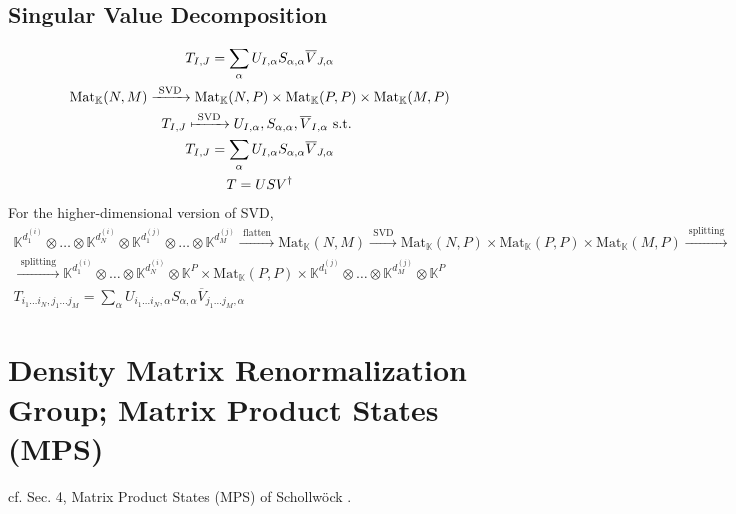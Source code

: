 \documentclass[10pt]{amsart}
\begin{document}
\begin{multicols*}{2}
\subsection{Singular Value Decomposition}  

\begin{equation}
\begin{gathered}
	T_{I,J} = \sum_{\alpha} U_{I,\alpha} S_{\alpha,\alpha} \overline{V}_{J,\alpha} \\ 
 \text{Mat}_{\mathbb{K}}(N,M) \xrightarrow{ \text{ SVD } } \text{Mat}_{\mathbb{K}}(N,P) \times \text{Mat}_{\mathbb{K}}(P,P) \times \text{Mat}_{\mathbb{K}}(M,P)    \\
	T_{I,J} \xmapsto{ \text{ SVD } } U_{I,\alpha}, S_{\alpha,\alpha} , \overline{V}_{I,\alpha} \text{ s.t. } \\
T_{I,J} = \sum_{\alpha} U_{I,\alpha} S_{\alpha, \alpha} \overline{V}_{J,\alpha}    \\
T=USV^{\dag}
\end{gathered}
\end{equation}
For the higher-dimensional version of SVD, 
\begin{equation}
\begin{gathered}
	\mathbb{K}^{d_1^{(i)} } \otimes \dots \otimes \mathbb{K}^{d^{(i)}_N} \otimes \mathbb{K}^{d_1^{(j)} }\otimes \dots \otimes \mathbb{K}^{d_M^{(j)} }  \xrightarrow{ \text{ flatten } } \text{Mat}_{\mathbb{K}}(N,M) \xrightarrow{ \text{ SVD } }     \text{Mat}_{\mathbb{K}}(N,P) \times \text{Mat}_{\mathbb{K}}(P,P) \times \text{Mat}_{\mathbb{K}}(M,P) \xrightarrow{ \text{ splitting } } \\ 
\xrightarrow{ \text{ splitting } } \mathbb{K}^{d_1^{(i)} } \otimes \dots \otimes \mathbb{K}^{d^{(i)}_N} \otimes \mathbb{K}^P \times \text{Mat}_{\mathbb{K}}(P,P) \times  \mathbb{K}^{d_1^{(j)} }\otimes \dots \otimes \mathbb{K}^{d_M^{(j)} } \otimes \mathbb{K}^P  \\
T_{i_1\dots i_N,j_1 \dots j_M} = \sum_{\alpha} U_{i_1\dots i_N,\alpha} S_{\alpha,\alpha} \overline{V}_{j_1 \dots j_M, \alpha}
\end{gathered}
\end{equation}

\section{Density Matrix Renormalization Group; Matrix Product States (MPS)}

cf. Sec. 4, Matrix Product States (MPS) of Schollw\"{o}ck \cite{Scho2010}.  


\end{multicols*}
\end{document}
